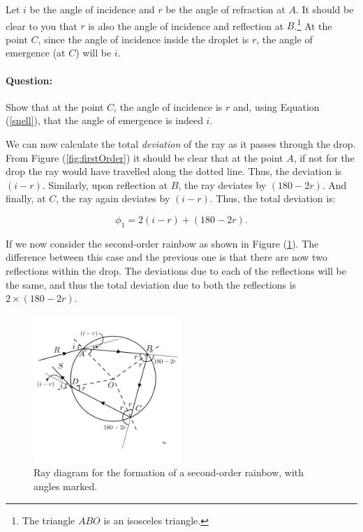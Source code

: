 \begin{refsection}
Let $i$ be the angle of incidence and $r$ be the angle of refraction at $A$. It should be clear to you that $r$ is also the angle of incidence and reflection at $B$.\footnote{The triangle $ABO$ is an isosceles triangle.} At the point $C$, since the angle of incidence inside the droplet is $r$, the angle of emergence (at $C$) will be $i$. 

\begin{question}
\paragraph{Question:} Show that at the point $C$, the angle of incidence is $r$ and, using Equation (\ref{snell}), that the angle of emergence is indeed $i$.
\end{question}

We can now calculate the total \textit{deviation} of the ray as it passes through the drop. From Figure (\ref{fig:firstOrder}) it should be clear that at the point $A$, if not for the drop the ray would have travelled along the dotted line. Thus, the deviation is $(i-r)$. Similarly, upon reflection at $B$, the ray deviates by $(180-2r)$. And finally, at $C$, the ray again deviates by $(i-r)$. Thus, the total deviation is:

\begin{equation}
\phi_{1}=2(i-r)+(180-2r).
\end{equation}


If we now consider the second-order rainbow as shown in Figure (\ref{fig:secondOrder}). The difference between this case and the previous one is that there are now two reflections within the drop. The deviations due to each of the reflections will be the same, and thus the total deviation due to both the reflections is $2\times (180 - 2r)$. 


\begin{figure}[!htb]
    \centering
    \includegraphics[width=0.5\textwidth]{figs/rainbow2.png}
    \caption{Ray diagram for the formation of a second-order rainbow, with angles marked.}
    \label{fig:secondOrder}
\end{figure}




\end{refsection}
